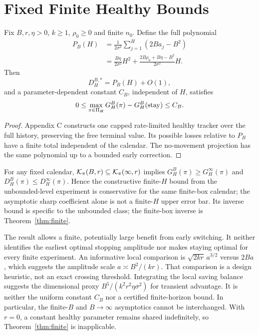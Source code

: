 \section{Fixed Finite Healthy Bounds}
\begin{theorem}\label{thm:finite}
Fix $B,r,\eta>0$, $k\ge1$, $\rho_0\ge0$ and finite $n_0$. Define the full polynomial
\begin{align}
 P_B(H)&=\frac1{2\sigma^2}\sum_{j=1}^H(2Ba_j-B^2)\nonumber\\
 &=\frac{B\eta}{2\sigma^2}H^2+
 \frac{2B\rho_0+B\eta-B^2}{2\sigma^2}H.\label{eq:PB}
\end{align}
Then
\begin{equation}
 D_H^{B,*}=P_B(H)+O(1),\label{eq:finite}
\end{equation}
and a parameter-dependent constant $C_B$, independent of $H$, satisfies
\begin{equation}
 0\le\max_{\pi\in\Pi_H}G_H^B(\pi)-G_H^B(\mathrm{stay})\le C_B.\label{eq:regret}
\end{equation}
\end{theorem}
\begin{proof}
Appendix C constructs one capped rate-limited healthy tracker over the full history, preserving the free terminal value. Its possible losses relative to $P_B$ have a finite total independent of the calendar. The no-movement projection has the same polynomial up to a bounded early correction.\end{proof}

For any fixed calendar, $\mathcal K_\pi(B,r)\subseteq\mathcal K_\pi(\infty,r)$ implies $G_H^B(\pi)\ge G_H^\infty(\pi)$ and $D_H^B(\pi)\le D_H^\infty(\pi)$. Hence the constructive finite-$H$ bound from the unbounded-level experiment is conservative for the same finite-box calendar; the asymptotic sharp coefficient alone is not a finite-$H$ upper error bar. Its inverse bound is specific to the unbounded class; the finite-box inverse is Theorem~\ref{thm:finite}.

The result allows a finite, potentially large benefit from early switching. It neither identifies the earliest optimal stopping amplitude nor makes staying optimal for every finite experiment. An informative local comparison is $\sqrt{2kr}\,a^{3/2}$ versus $2Ba$, which suggests the amplitude scale $a\asymp B^2/(kr)$. That comparison is a design heuristic, not an exact crossing threshold. Integrating the local saving balance suggests the dimensional proxy $B^5/(k^2r^2\eta\sigma^2)$ for transient advantage. It is neither the uniform constant $C_B$ nor a certified finite-horizon bound. In particular, the finite-$B$ and $B\to\infty$ asymptotics cannot be interchanged. With $r=0$, a constant healthy parameter remains shared indefinitely, so Theorem~\ref{thm:finite} is inapplicable.

